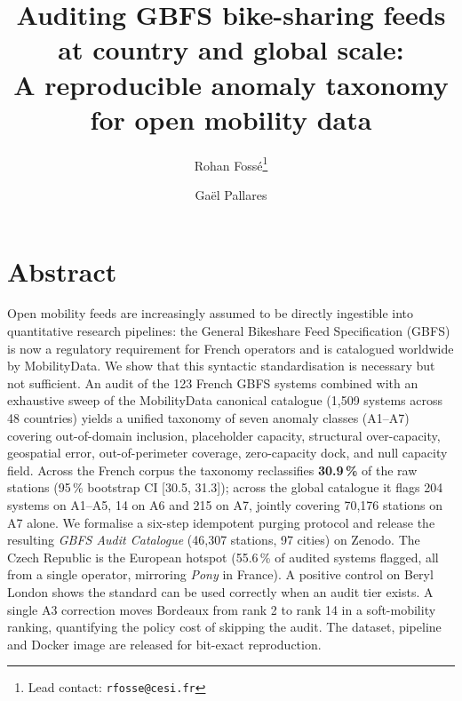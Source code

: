 \documentclass[11pt,a4paper]{article}
\title{\bfseries\sffamily\Large Auditing GBFS bike-sharing feeds at country and global scale:\\
A reproducible anomaly taxonomy for open mobility data}
\author[1]{Rohan Foss\'e\thanks{Lead contact: \texttt{rfosse@cesi.fr}}}
\author[2]{Ga\"el Pallares}
\affil[1]{CESI Engineering School, Montpellier, France}
\affil[2]{CESI LINEACT (EA 7527), Montpellier, France}
\date{}
\begin{document}
\maketitle

%

\section*{Abstract}
\noindent
Open mobility feeds are increasingly assumed to be directly ingestible
into quantitative research pipelines: the General Bikeshare Feed
Specification (GBFS) is now a regulatory requirement for French
operators and is catalogued worldwide by MobilityData. We show that
this syntactic standardisation is necessary but not sufficient. An
audit of the 123 French GBFS systems combined with an exhaustive
sweep of the MobilityData canonical catalogue (1{,}509 systems
across 48 countries) yields a unified taxonomy of seven anomaly
classes (A1--A7) covering out-of-domain inclusion, placeholder
capacity, structural over-capacity, geospatial error,
out-of-perimeter coverage, zero-capacity dock, and null
capacity field. Across the French corpus the taxonomy
reclassifies \textbf{30.9\,\%} of the raw stations (95\,\%
bootstrap CI [30.5, 31.3]); across the global catalogue it flags
204 systems on A1--A5, 14 on A6 and 215 on A7, jointly covering
70{,}176 stations on A7 alone. We formalise a six-step idempotent
purging protocol and release the resulting \emph{GBFS Audit
Catalogue} (46{,}307 stations, 97 cities) on Zenodo. The Czech Republic is the European
hotspot (55.6\,\% of audited systems flagged, all from a single
operator, mirroring \emph{Pony} in France). A positive control on
Beryl London shows the standard can be used correctly when an audit
tier exists. A single A3 correction moves Bordeaux from rank 2 to
rank 14 in a soft-mobility ranking, quantifying the policy cost of
skipping the audit. The dataset, pipeline and Docker image are
released for bit-exact reproduction.
\end{document}

